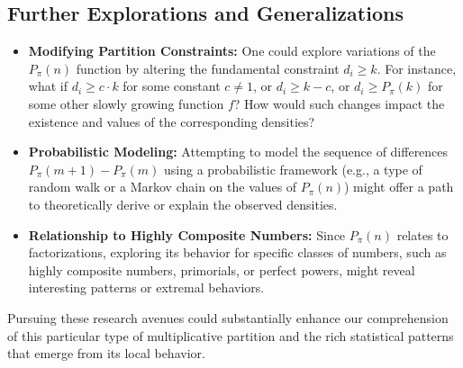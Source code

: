\documentclass[]{article}
\theoremstyle{plain}%
\theoremstyle{definition}
\theoremstyle{remark}
\begin{document}
	\subsection{Further Explorations and Generalizations}
	\begin{itemize}
		\item \textbf{Modifying Partition Constraints:} One could explore variations of the $P_{\pi}(n)$ function by altering the fundamental constraint $d_i \ge k$. For instance, what if $d_i \ge c \cdot k$ for some constant $c \neq 1$, or $d_i \ge k-c$, or $d_i \ge P_{\pi}(k)$ for some other slowly growing function $f$? How would such changes impact the existence and values of the corresponding densities?
		\item \textbf{Probabilistic Modeling:} Attempting to model the sequence of differences $P_{\pi}(m+1) - P_{\pi}(m)$ using a probabilistic framework (e.g., a type of random walk or a Markov chain on the values of $P_{\pi}(n)$) might offer a path to theoretically derive or explain the observed densities.
		\item \textbf{Relationship to Highly Composite Numbers:} Since $P_{\pi}(n)$ relates to factorizations, exploring its behavior for specific classes of numbers, such as highly composite numbers, primorials, or perfect powers, might reveal interesting patterns or extremal behaviors.
	\end{itemize}
	
	Pursuing these research avenues could substantially enhance our comprehension of this particular type of multiplicative partition and the rich statistical patterns that emerge from its local behavior.
	
	
	
\end{document}

